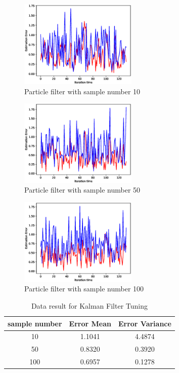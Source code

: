\documentclass[letterpaper,11pt]{article}
\begin{document}
\begin{figure}[ht] 
	\centering
	\includegraphics[width=0.5\textwidth]{./particle_10.eps}
	\caption{Particle filter with sample number 10}
	\label{fig:particle_10}
\end{figure}

\begin{figure}[ht] 
	\centering
	\includegraphics[width=0.5\textwidth]{./particle_50.eps}
	\caption{Particle filter with sample number 50}
	\label{fig:particle_50}
\end{figure}
\begin{figure}[ht] 
	\centering
	\includegraphics[width=0.5\textwidth]{./particle_100.eps}
	\caption{Particle filter with sample number 100}
	\label{fig:particle_100}
\end{figure}

\begin{table}[]
\centering
\begin{tabular}{|c|c|c|}
\hline
sample number & Error Mean & Error Variance \\ \hline
10  & 1.1041     & 4.4874         \\ \hline
50   & 0.8320     & 0.3920         \\ \hline
100     & 0.6957     & 0.1278         \\ \hline
\end{tabular}
\caption{Data result for Kalman Filter Tuning}
\label{tab:particle_tune}
\end{table}
\end{document}
